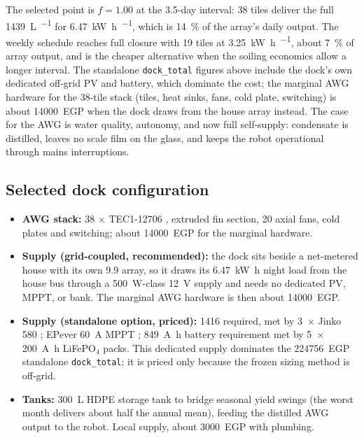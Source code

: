\documentclass[11pt,a4paper]{article}
\begin{document}
The selected point is $f=1.00$ at the \num{3.5}-day interval: 38 tiles
deliver the full \SI{1439}{\liter\per\yr} for \SI{6.47}{\kilo\watt\hour\per\dy},
which is \SI{14}{\percent} of the array's daily output. The weekly schedule
reaches full closure with 19 tiles at \SI{3.25}{\kilo\watt\hour\per\dy},
about \SI{7}{\percent} of array output, and is the cheaper alternative when
the soiling economics allow a longer interval. The standalone
\texttt{dock\_total} figures above include the dock's own dedicated off-grid
PV and battery, which dominate the cost; the marginal AWG hardware for the
38-tile stack (tiles, heat sinks, fans, cold plate, switching) is about
\num{14000}~EGP when the dock draws from the house array instead. The case
for the AWG is water quality, autonomy, and now full self-supply: condensate
is distilled, leaves no scale film on the glass, and keeps the robot
operational through mains interruptions.

\subsection{Selected dock configuration}

\begin{itemize}[nosep]
  \item \textbf{AWG stack:} 38 $\times$ TEC1-12706 \cite{futelec2026tec},
        extruded fin section, 20 axial fans, cold plates and switching;
        about \num{14000}~EGP for the marginal hardware.
  \item \textbf{Supply (grid-coupled, recommended):} the dock sits beside a
        net-metered house with its own \SI{9.9}{\kWp} array, so it draws its
        \SI{6.47}{\kilo\watt\hour} night load from the house bus through a
        \SI{500}{\watt}-class \SI{12}{\volt} supply and needs no dedicated
        PV, MPPT, or bank. The marginal AWG hardware is then about
        \num{14000}~EGP.
  \item \textbf{Supply (standalone option, priced):} \SI{1416}{\Wp} required,
        met by 3~$\times$ Jinko \SI{580}{\Wp} \cite{jinko2024tigerneo}; EPever
        \SI{60}{\ampere} MPPT \cite{epever2023tracer}; \SI{849}{\ampere\hour}
        battery requirement met by 5~$\times$ \SI{200}{\ampere\hour}
        LiFePO$_4$ packs. This dedicated supply dominates the
        \num{224756}~EGP standalone \texttt{dock\_total}; it is priced only
        because the frozen sizing method is off-grid.
  \item \textbf{Tanks:} \SI{300}{\liter} HDPE storage tank to bridge seasonal
        yield swings (the worst month delivers about half the annual mean),
        feeding the distilled AWG output to the robot. Local supply, about
        \num{3000}~EGP with plumbing.
\end{itemize}
\end{document}
